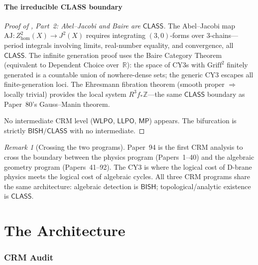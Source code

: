\documentclass[11pt]{article}
\theoremstyle{plain}
\theoremstyle{definition}
\theoremstyle{remark}
\newtheorem{remark}[theorem]{Remark}
\newcommand{\ZZ}{\mathbb{Z}}
\newcommand{\RR}{\mathbb{R}}
\newcommand{\BISH}{\mathsf{BISH}}
\newcommand{\WLPO}{\mathsf{WLPO}}
\newcommand{\LLPO}{\mathsf{LLPO}}
\newcommand{\MP}{\mathsf{MP}}
\newcommand{\CLASS}{\mathsf{CLASS}}
\newcommand{\AJ}{\mathrm{AJ}}
\begin{document}
\subsection{The irreducible CLASS boundary}

\begin{proof}[Proof of , Part~2: Abel--Jacobi and Baire are $\CLASS$]
The Abel--Jacobi map $\AJ: Z^2_{\mathrm{hom}}(X) \to J^2(X)$ requires integrating $(3,0)$-forms over 3-chains---period integrals involving limits, real-number equality, and convergence, all $\CLASS$.  The infinite generation proof uses the Baire Category Theorem (equivalent to Dependent Choice over~$\RR$): the space of CY3s with $\mathrm{Griff}^2$ finitely generated is a countable union of nowhere-dense sets; the generic CY3 escapes all finite-generation loci.  The Ehresmann fibration theorem (smooth proper $\Rightarrow$ locally trivial) provides the local system $R^3 f_* \ZZ$---the same $\CLASS$ boundary as Paper~80's Gauss--Manin theorem.

No intermediate CRM level ($\WLPO$, $\LLPO$, $\MP$) appears.  The bifurcation is strictly $\BISH/\CLASS$ with no intermediate.
\end{proof}

\begin{remark}[Crossing the two programs]
Paper~94 is the first CRM analysis to cross the boundary between the physics program (Papers~1--40) and the algebraic geometry program (Papers~41--92).  The CY3 is where the logical cost of D-brane physics meets the logical cost of algebraic cycles.  All three CRM programs share the same architecture: algebraic detection is $\BISH$; topological/analytic existence is $\CLASS$.
\end{remark}



\part{The Architecture}\label{part:architecture}

\section{CRM Audit}\label{sec:audit}
\end{document}
